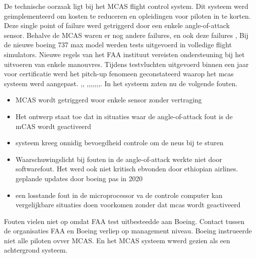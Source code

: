 \documentclass{article}
\begin{document}
	De technische oorzaak ligt bij het MCAS flight control system. Dit systeem werd geimplementeerd om kosten te reduceren en opleidingen voor piloten  in te korten.  Deze single point of failure \cite{uran05042019SPOF}
	werd getriggerd door een enkele angle-of-attack sensor\cite{boeing737maxdisplay}.
	Behalve de MCAS waren er nog andere failures\cite{fehrm24112020737changes}, en ook deze failures \cite{dohertylindeman15032019737problems}
	\cite{travis18042019737maxsoftwaredevop}, Bij de  nieuwe boeing 737 max model werden tests uitgevoerd in volledige flight simulators. Nieuwe   regels van het FAA instituut vereisten ondersteuning bij het uitvoeren van enkele manouvres. Tijdens testvluchten uitgevoerd binnen een jaar voor certificatie werd het pitch-up fenomeen geconstateerd waarop het mcas systeem werd aangepast. 
	\cite{hawkins22032019737maxairplanes},\cite{barnett05052019737maxcrisis}, \cite{thomas30082020737safest},\cite{boyle18112020737maxupgrade},\cite{bergstraburgess122019737maxMcasAlgorithm},\cite{737mcas},\cite{german190620217372yaftergrounded},\cite{beningo02052019boeinglessons},\cite{bloomberg26092019failedpred},\cite{afacwaLostSafeguards}.
	In het  systeem zaten nu de volgende fouten.
	
	\begin{itemize}
		\item MCAS wordt getriggerd woor enkele sensor zonder vertraging
		\item Het ontwerp staat toe dat  in situaties waar de angle-of-attack fout is de mCAS wordt geactiveerd
		\item systeem kreeg onnidig bevoegdheid controle om de neus bij te sturen
		\item  Waarschuwingslicht bij fouten in de angle-of-attack werkte niet door  softwarefout. Het werd ook niet kritisch ebvonden door ethiopian airlines. geplande updates door boeing pas in 2020
		\item een losstande fout in de microprocessor va de controle computer kan vergelijkbare situaties doen voorkomen zonder dat mcas wordt geactiveerd
	\end{itemize}
	Fouten vielen niet op omdat FAA test uitbesteedde aan Boeing. Contact tussen de organisaties FAA en Boeing verliep op management niveau. Boeing instrueerde niet alle piloten ovver MCAS. En het MCAS systeem wwerd gezien als een achtergrond  systeem.
	
\end{document}

